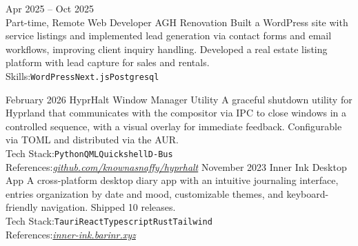 \documentclass[9pt]{developercv} %
\begin{document}

\begin{entrylist}
	\entry
		{Apr 2025 -- Oct 2025\\\footnotesize{Part-time, Remote}}
		{Web Developer}
		{AGH Renovation}
		{Built a WordPress site with service listings and implemented lead
		generation via contact forms and email workflows, improving client inquiry
		handling. Developed a real estate listing platform with lead capture for
		sales and rentals.
		\\[0.3\baselineskip]
		Skills:\hspace{8pt}\texttt{WordPress}\slashsep\texttt{Next.js}\slashsep\texttt{Postgresql}}
\end{entrylist}



\begin{entrylist}
	\entry
		{February 2026}
		{HyprHalt}
		{Window Manager Utility}
		{A graceful shutdown utility for Hyprland that communicates with the compositor via IPC to close windows in a controlled sequence, with a visual overlay for immediate feedback. Configurable via TOML and distributed via the AUR.
		\\[0.3\baselineskip]
		Tech Stack:\hspace{8pt}\texttt{Python}\slashsep\texttt{QML}\slashsep\texttt{Quickshell}\slashsep\texttt{D-Bus}\\
		References:\hspace{8pt}\textit{\href{https://github.com/knownasnaffy/hyprhalt}{github.com/knownasnaffy/hyprhalt}}}
	\entry
		{November 2023}
		{Inner Ink}
		{Desktop App}
		{A cross-platform desktop diary app with an intuitive journaling interface, entries organization by date and mood, customizable themes, and keyboard-friendly navigation. Shipped 10 releases.
		\\[0.3\baselineskip]
		Tech Stack:\hspace{8pt}\texttt{Tauri}\slashsep\texttt{React}\slashsep\texttt{Typescript}\slashsep\texttt{Rust}\slashsep\texttt{Tailwind}\\
		References:\hspace{8pt}\textit{\href{https://inner-ink.barinr.xyz/}{inner-ink.barinr.xyz}}}
\end{entrylist}
\end{document}
